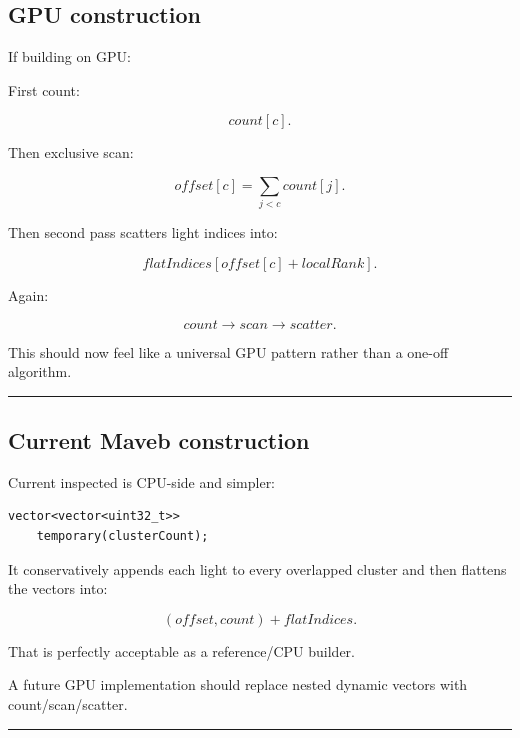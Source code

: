 \subsection{GPU construction}\label{04-visual-computing-ii-ch040-gpu-construction}

\hypertarget{04-visual-computing-ii-ch040-gpu-construction}{}

If building on GPU:

First count:

\[
count[c].
\]

Then exclusive scan:

\[
offset[c]
=
\sum_{j<c}count[j].
\]

Then second pass scatters light indices into:

\[
flatIndices[
offset[c]+localRank
].
\]

Again:

\[
\boxed{
count
\rightarrow
scan
\rightarrow
scatter.
}
\]

This should now feel like a universal GPU pattern rather than a one-off algorithm.

\begin{center}\rule{0.5\linewidth}{0.5pt}\end{center}

\subsection{Current Maveb construction}\label{04-visual-computing-ii-ch040-current-maveb-construction}

\hypertarget{04-visual-computing-ii-ch040-current-maveb-construction}{}

Current inspected  is CPU-side and simpler:

\begin{verbatim}
vector<vector<uint32_t>>
    temporary(clusterCount);
\end{verbatim}

It conservatively appends each light to every overlapped cluster and then flattens the vectors into:

\[
(offset,count)
+
flatIndices.
\]

That is perfectly acceptable as a reference/CPU builder.

A future GPU implementation should replace nested dynamic vectors with count/scan/scatter.

\begin{center}\rule{0.5\linewidth}{0.5pt}\end{center}


